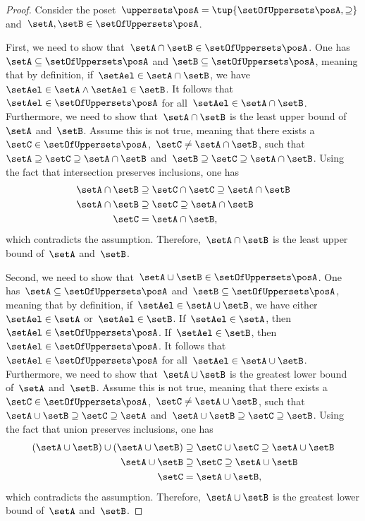 \begin{proof}
	Consider the poset~$\uppersets \posA=\tup{\setOfUppersets \posA,\supseteq}$ and~$\setA,\setB\in \setOfUppersets \posA$.

	First, we need to show that~$\setA\cap \setB\in \setOfUppersets \posA$.
	One has~$\setA \subseteq \setOfUppersets \posA$ and $\setB\subseteq \setOfUppersets \posA$, meaning that by definition, if~$\setAel\in \setA\cap \setB$, we have~$\setAel \in \setA \wedge \setAel \in \setB$.
	It follows that~$\setAel \in \setOfUppersets \posA$ for all~$\setAel \in \setA\cap \setB$.
	Furthermore, we need to show that~$\setA\cap \setB$ is the least upper bound of~$\setA$ and~$\setB$.
	Assume this is not true, meaning that there exists a~$\setC\in \setOfUppersets \posA$,~$\setC\neq \setA\cap \setB$, such that~$\setA\supseteq \setC\supseteq \setA\cap \setB$ and~$\setB\supseteq \setC\supseteq \setA\cap \setB$.
	Using the fact that intersection preserves inclusions, one has
	\begin{equation}
		\begin{aligned}
			\setA\cap \setB & \supseteq \setC\cap \setC \supseteq \setA\cap \setB \\
			\setA\cap \setB & \supseteq \setC \supseteq \setA\cap \setB           \\
			\setC           & = \setA\cap \setB,
		\end{aligned}
	\end{equation}
	which contradicts the assumption.
	Therefore,~$\setA\cap \setB$ is the least upper bound of~$\setA$ and~$\setB$.

	Second, we need to show that~$\setA\cup \setB\in \setOfUppersets \posA$.
	One has~$\setA\subseteq \setOfUppersets \posA$ and~$\setB\subseteq \setOfUppersets \posA$, meaning that by definition, if~$\setAel\in \setA\cup \setB$, we have either~$\setAel\in \setA$ or~$\setAel\in \setB$.
	If~$\setAel\in \setA$, then~$\setAel\in \setOfUppersets \posA$.
	If~$\setAel\in \setB$, then~$\setAel \in \setOfUppersets \posA$.
	It follows that~$\setAel \in \setOfUppersets \posA$ for all~$\setAel\in \setA\cup \setB$.
	Furthermore, we need to show that~$\setA\cup \setB$ is the greatest lower bound of~$\setA$ and~$\setB$.
	Assume this is not true, meaning that there exists a~$\setC\in \setOfUppersets \posA$,~$\setC\neq \setA\cup \setB$, such that~$\setA\cup \setB\supseteq \setC\supseteq \setA$ and~$\setA\cup \setB\supseteq \setC\supseteq \setB$.
	Using the fact that union preserves inclusions, one has
	\begin{equation}
		\begin{aligned}
			(\setA\cup \setB)
			\cup (\setA\cup \setB) & \supseteq \setC \cup \setC \supseteq \setA\cup \setB \\
			\setA\cup \setB        & \supseteq \setC\supseteq \setA\cup \setB             \\
			\setC                  & =\setA\cup \setB,
		\end{aligned}
	\end{equation}
	which contradicts the assumption.
	Therefore,~$\setA\cup \setB$ is the greatest lower bound of~$\setA$ and~$\setB$.


\end{proof}
